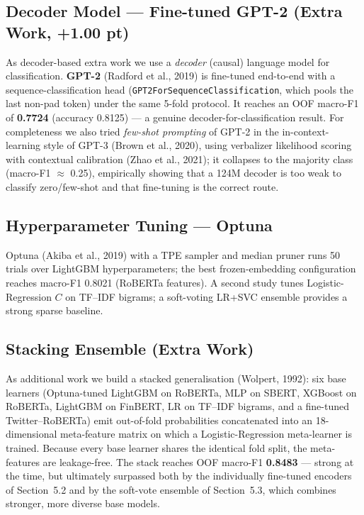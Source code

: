 \documentclass[11pt,a4paper]{article}
\begin{document}
\subsection{Decoder Model --- Fine-tuned GPT-2 (Extra Work, +1.00 pt)}
As decoder-based extra work we use a \emph{decoder} (causal) language model for classification.
\textbf{GPT-2} (Radford et al., 2019) is fine-tuned end-to-end with a sequence-classification head
(\texttt{GPT2ForSequenceClassification}, which pools the last non-pad token) under the same 5-fold
protocol. It reaches an OOF macro-F1 of \textbf{0.7724} (accuracy 0.8125) --- a genuine
decoder-for-classification result. For completeness we also tried \emph{few-shot prompting} of GPT-2
in the in-context-learning style of GPT-3 (Brown et al., 2020), using verbalizer likelihood scoring
with contextual calibration (Zhao et al., 2021); it collapses to the majority class (macro-F1
$\approx$ 0.25), empirically showing that a 124M decoder is too weak to classify zero/few-shot and
that fine-tuning is the correct route.

\subsection{Hyperparameter Tuning --- Optuna}
Optuna (Akiba et al., 2019) with a TPE sampler and median pruner runs 50 trials over LightGBM
hyperparameters; the best frozen-embedding configuration reaches macro-F1 0.8021 (RoBERTa features).
A second study tunes Logistic-Regression $C$ on TF--IDF bigrams; a soft-voting LR+SVC ensemble
provides a strong sparse baseline.

\subsection{Stacking Ensemble (Extra Work)}
As additional work we build a stacked generalisation (Wolpert, 1992): six base learners
(Optuna-tuned LightGBM on RoBERTa, MLP on SBERT, XGBoost on RoBERTa, LightGBM on FinBERT, LR on
TF--IDF bigrams, and a fine-tuned Twitter--RoBERTa) emit out-of-fold probabilities concatenated into
an 18-dimensional meta-feature matrix on which a Logistic-Regression meta-learner is trained. Because
every base learner shares the identical fold split, the meta-features are leakage-free. The stack
reaches OOF macro-F1 \textbf{0.8483} --- strong at the time, but ultimately surpassed both by the
individually fine-tuned encoders of Section~5.2 and by the soft-vote ensemble of Section~5.3, which
combines stronger, more diverse base models.
\end{document}
